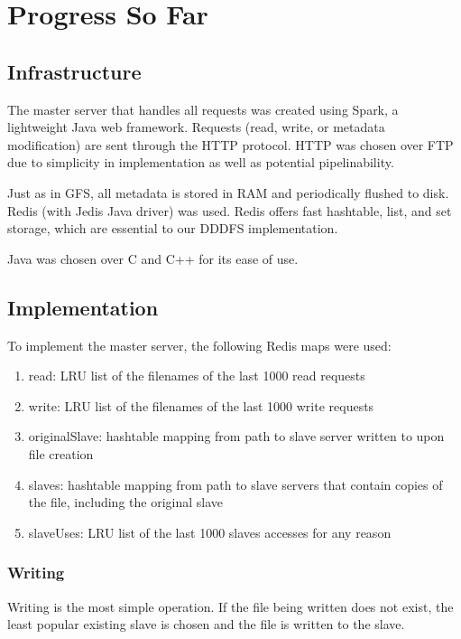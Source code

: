 \documentclass{article}
\begin{document}
\section{Progress So Far}

\subsection{Infrastructure}

The master server that handles all requests was created using Spark, a lightweight Java web framework. Requests (read, write, or metadata modification) are sent through the HTTP protocol. HTTP was chosen over FTP due to simplicity in implementation as well as potential pipelinability. 

Just as in GFS, all metadata is stored in RAM and periodically flushed to disk. Redis (with Jedis Java driver) was used. Redis offers fast hashtable, list, and set storage, which are essential to our DDDFS implementation. 

Java was chosen over C and C++ for its ease of use. 

\subsection{Implementation}

To implement the master server, the following Redis maps were used:

\begin{enumerate}
\item read: LRU list of the filenames of the last 1000 read requests
\item write: LRU list of the filenames of the last 1000 write requests
\item originalSlave: hashtable mapping from path to slave server written to upon file creation
\item slaves: hashtable mapping from path to slave servers that contain copies of the file, including the original slave
\item slaveUses: LRU list of the last 1000 slaves accesses for any reason
\end{enumerate}

\subsubsection{Writing}

Writing is the most simple operation. If the file being written does not exist, the least popular existing slave is chosen and the file is written to the slave. 
\end{document}
